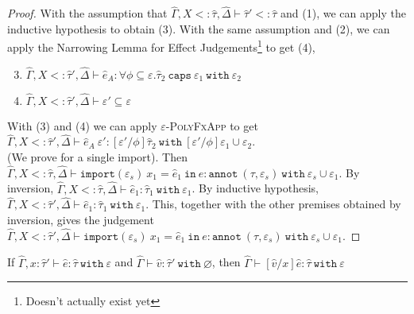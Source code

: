 \documentclass{llncs}
\newcommand{\keywadj}[1]{\mathtt{#1}}
\newcommand{\keyw}[1]{\keywadj{#1}~}
\newcommand{\kw}[1]{\keyw{ #1 }}
\newcommand{\kwa}[1]{\keywadj{ #1 }}
\begin{document}
\begin{proof}
With the assumption that $\hat \Gamma, X <: \hat \tau, \hat \Delta \vdash \hat \tau' <: \hat \tau$ and (1), we can apply the inductive hypothesis to obtain (3). With the same assumption and (2), we can apply the Narrowing Lemma for Effect Judgements\footnote{Doesn't actually exist yet} to get (4),

\begin{enumerate}
	\setcounter{enumi}{2}
	\item $\hat \Gamma, X <: \hat \tau', \hat \Delta \vdash \hat e_A: \forall \phi \subseteq \varepsilon. \hat \tau_2~\kw{caps} \varepsilon_1~\kw{with} \varepsilon_2$
	\item $\hat \Gamma, X <: \hat \tau', \hat \Delta \vdash \varepsilon' \subseteq \varepsilon$
\end{enumerate}

With (3) and (4) we can apply \textsc{$\varepsilon$-PolyFxApp} to get $\hat \Gamma, X <: \hat \tau', \hat \Delta \vdash \hat e_A~\varepsilon': [\varepsilon'/\phi]\hat \tau_2~\kw{with} [\varepsilon'/\phi]\varepsilon_1 \cup \varepsilon_2$. \\

 (We prove for a single import). Then $\hat \Gamma, X <: \hat \tau, \hat \Delta \vdash \kwa{import}(\varepsilon_s)~x_1 = \hat e_1~\kw{in} e: \kw{annot}(\tau, \varepsilon_s)~\kw{with} \varepsilon_s \cup \varepsilon_1$. By inversion, $\hat \Gamma, X <: \hat \tau, \hat \Delta \vdash \hat e_1: \hat \tau_1~\kw{with} \varepsilon_1$. By inductive hypothesis, $\hat \Gamma, X <: \hat \tau', \hat \Delta \vdash \hat e_1: \hat \tau_1~\kw{with} \varepsilon_1$. This, together with the other premises obtained by inversion, gives the judgement $\hat \Gamma, X <: \hat \tau', \hat \Delta \vdash \kwa{import}(\varepsilon_s)~x_1 = \hat e_1~\kw{in} e: \kw{annot}(\tau, \varepsilon_s)~\kw{with} \varepsilon_s \cup \varepsilon_1$.

\end{proof}



\hrulefill

\begin{lemma}
If $\hat \Gamma, x: \hat \tau' \vdash \hat e: \hat \tau~\kw{with} \varepsilon$ and $\hat \Gamma \vdash \hat v: \hat \tau'~\kw{with} \varnothing$, then $\hat \Gamma \vdash [\hat v/x]\hat e: \hat \tau~\kw{with} \varepsilon$
\end{lemma}
\end{document}
